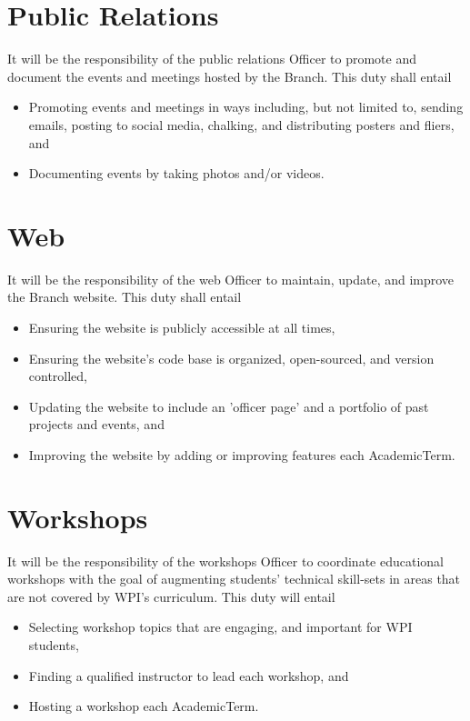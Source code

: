 \section{Public Relations}\label{Bylaw:OfficerBoard:PublicRelations}
    It will be the responsibility of the public relations \gls{Officer} to promote and document the events and meetings hosted by the \gls{Branch}. This duty shall entail
    \begin{itemize}
        \item{Promoting events and meetings in ways including, but not limited to, sending emails, posting to social media, chalking, and distributing posters and fliers, and}
        \item{Documenting events by taking photos and/or videos.} 
    \end{itemize}

\section{Web}\label{Bylaw:OfficerBoard:Web}
    It will be the responsibility of the web \gls{Officer} to maintain, update, and improve the \gls{Branch} website. This duty shall entail
    \begin{itemize}
        \item{Ensuring the website is publicly accessible at all times,}
        \item{Ensuring the website's code base is organized, open-sourced, and version controlled, }
        \item{Updating the website to include an 'officer page' and a portfolio of past projects and events, and}
        \item{Improving the website by adding or improving features each \gls{AcademicTerm}.}
    \end{itemize}

\section{Workshops}\label{Bylaw:OfficerBoard:Workshops}
    It will be the responsibility of the workshops \gls{Officer} to coordinate educational workshops with the goal of augmenting students' technical skill-sets in areas that are not covered by \gls{WPI}'s curriculum. This duty will entail
    \begin{itemize}
        \item{Selecting workshop topics that are engaging, and important for \acrshort{WPI} students,}
        \item{Finding a qualified instructor to lead each workshop, and}
        \item{Hosting a workshop each \gls{AcademicTerm}.}
    \end{itemize}

